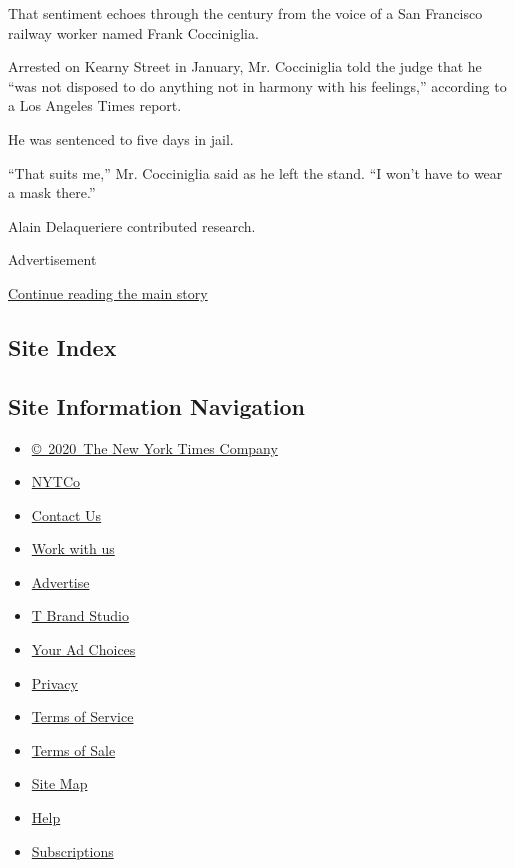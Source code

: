 That sentiment echoes through the century from the voice of a San
Francisco railway worker named Frank Cocciniglia.

Arrested on Kearny Street in January, Mr. Cocciniglia told the judge
that he ``was not disposed to do anything not in harmony with his
feelings,'' according to a Los Angeles Times report.

He was sentenced to five days in jail.

``That suits me,'' Mr. Cocciniglia said as he left the stand. ``I won't
have to wear a mask there.''

Alain Delaqueriere contributed research.

Advertisement

\protect\hyperlink{after-bottom}{Continue reading the main story}

\hypertarget{site-index}{%
\subsection{Site Index}\label{site-index}}

\hypertarget{site-information-navigation}{%
\subsection{Site Information
Navigation}\label{site-information-navigation}}

\begin{itemize}
\tightlist
\item
  \href{https://help.nytimes3xbfgragh.onion/hc/en-us/articles/115014792127-Copyright-notice}{©~2020~The
  New York Times Company}
\end{itemize}

\begin{itemize}
\tightlist
\item
  \href{https://www.nytco.com/}{NYTCo}
\item
  \href{https://help.nytimes3xbfgragh.onion/hc/en-us/articles/115015385887-Contact-Us}{Contact
  Us}
\item
  \href{https://www.nytco.com/careers/}{Work with us}
\item
  \href{https://nytmediakit.com/}{Advertise}
\item
  \href{http://www.tbrandstudio.com/}{T Brand Studio}
\item
  \href{https://www.nytimes3xbfgragh.onion/privacy/cookie-policy\#how-do-i-manage-trackers}{Your
  Ad Choices}
\item
  \href{https://www.nytimes3xbfgragh.onion/privacy}{Privacy}
\item
  \href{https://help.nytimes3xbfgragh.onion/hc/en-us/articles/115014893428-Terms-of-service}{Terms
  of Service}
\item
  \href{https://help.nytimes3xbfgragh.onion/hc/en-us/articles/115014893968-Terms-of-sale}{Terms
  of Sale}
\item
  \href{https://spiderbites.nytimes3xbfgragh.onion}{Site Map}
\item
  \href{https://help.nytimes3xbfgragh.onion/hc/en-us}{Help}
\item
  \href{https://www.nytimes3xbfgragh.onion/subscription?campaignId=37WXW}{Subscriptions}
\end{itemize}
